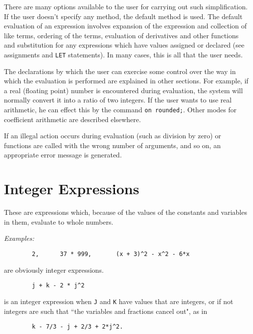 There are many options available to the user for carrying out such
simplification.  If the user doesn't specify any
method, the default method is used.  The default evaluation of an
expression involves expansion of the expression and collection of like
terms, ordering of the terms, evaluation of derivatives and other
functions and substitution for any expressions which have values assigned
or declared (see assignments and {\tt LET} statements).  In many cases,
this is all that the user needs.

The declarations by which the user can exercise some control over the way
in which the evaluation is performed are explained in other sections.  For
example, if a real (floating point) number is encountered during
evaluation, the system will normally convert it into a ratio of two
integers.  If the user wants to use real arithmetic, he can effect this by
the command {\tt on rounded;}.  Other modes for
coefficient arithmetic are described elsewhere.

If an illegal action occurs during evaluation (such as division by zero)
or functions are called with the wrong number of arguments, and so on, an
appropriate error message is generated.

\section{Integer Expressions}

These are expressions which, because of the values of the
constants and variables in them, evaluate to whole numbers.

{\it Examples:}
\begin{verbatim}
        2,      37 * 999,       (x + 3)^2 - x^2 - 6*x
\end{verbatim}
are obviously integer expressions.
\begin{verbatim}
        j + k - 2 * j^2
\end{verbatim}
is an integer expression when {\tt J} and {\tt K} have values that are
integers, or if not integers are such that ``the variables and fractions
cancel out", as in
\begin{verbatim}
        k - 7/3 - j + 2/3 + 2*j^2.
\end{verbatim}

